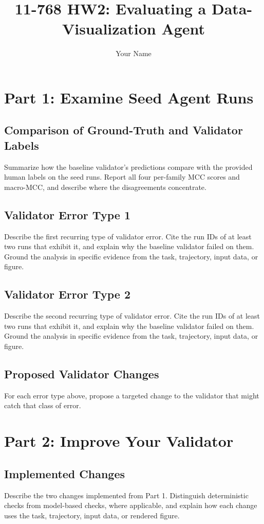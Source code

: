 \documentclass[11pt]{article}
\title{11-768 HW2: Evaluating a Data-Visualization Agent}
\author{Your Name}
\date{}
\begin{document}
\maketitle

\section{Part 1: Examine Seed Agent Runs}

\subsection{Comparison of Ground-Truth and Validator Labels}
Summarize how the baseline validator's predictions compare with the provided
human labels on the seed runs. Report all four per-family MCC scores and macro-MCC, and describe
where the disagreements concentrate.

\subsection{Validator Error Type 1}
Describe the first recurring type of validator error. Cite the run IDs of at
least two runs that exhibit it, and explain why the baseline validator failed
on them. Ground the analysis in specific evidence from the task, trajectory,
input data, or figure.

\subsection{Validator Error Type 2}
Describe the second recurring type of validator error. Cite the run IDs of at
least two runs that exhibit it, and explain why the baseline validator failed
on them. Ground the analysis in specific evidence from the task, trajectory,
input data, or figure.

\subsection{Proposed Validator Changes}
For each error type above, propose a targeted change to the validator that
might catch that class of error.

\section{Part 2: Improve Your Validator}

\subsection{Implemented Changes}
Describe the two changes implemented from Part 1. Distinguish deterministic
checks from model-based checks, where applicable, and explain how each change
uses the task, trajectory, input data, or rendered figure.
\end{document}
